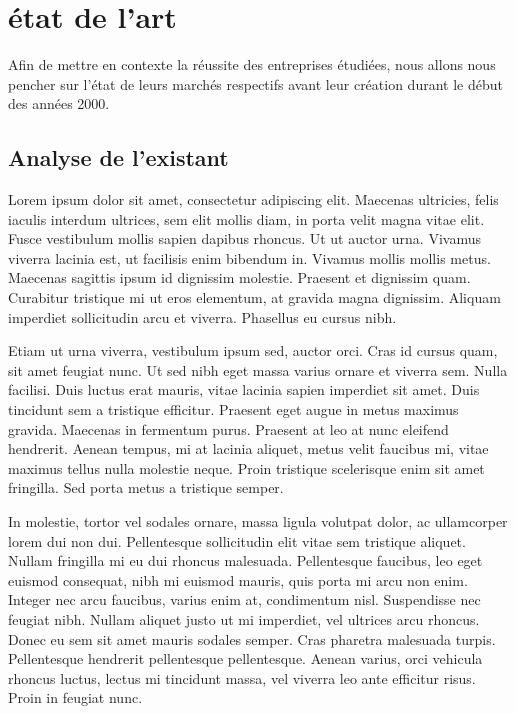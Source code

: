 \chapter{état de l’art}

Afin de mettre en contexte la réussite des entreprises étudiées, nous allons nous pencher sur l'état de leurs marchés respectifs avant leur création durant le début des années 2000.

\section{Analyse de l'existant }

Lorem ipsum dolor sit amet, consectetur adipiscing elit. Maecenas ultricies, felis iaculis interdum ultrices, sem elit mollis diam, in porta velit magna vitae elit. Fusce vestibulum mollis sapien dapibus rhoncus. Ut ut auctor urna. Vivamus viverra lacinia est, ut facilisis enim bibendum in. Vivamus mollis mollis metus. Maecenas sagittis ipsum id dignissim molestie. Praesent et dignissim quam. Curabitur tristique mi ut eros elementum, at gravida magna dignissim. Aliquam imperdiet sollicitudin arcu et viverra. Phasellus eu cursus nibh.

Etiam ut urna viverra, vestibulum ipsum sed, auctor orci. Cras id cursus quam, sit amet feugiat nunc. Ut sed nibh eget massa varius ornare et viverra sem. Nulla facilisi. Duis luctus erat mauris, vitae lacinia sapien imperdiet sit amet. Duis tincidunt sem a tristique efficitur. Praesent eget augue in metus maximus gravida. Maecenas in fermentum purus. Praesent at leo at nunc eleifend hendrerit. Aenean tempus, mi at lacinia aliquet, metus velit faucibus mi, vitae maximus tellus nulla molestie neque. Proin tristique scelerisque enim sit amet fringilla. Sed porta metus a tristique semper.

In molestie, tortor vel sodales ornare, massa ligula volutpat dolor, ac ullamcorper lorem dui non dui. Pellentesque sollicitudin elit vitae sem tristique aliquet. Nullam fringilla mi eu dui rhoncus malesuada. Pellentesque faucibus, leo eget euismod consequat, nibh mi euismod mauris, quis porta mi arcu non enim. Integer nec arcu faucibus, varius enim at, condimentum nisl. Suspendisse nec feugiat nibh. Nullam aliquet justo ut mi imperdiet, vel ultrices arcu rhoncus. Donec eu sem sit amet mauris sodales semper. Cras pharetra malesuada turpis. Pellentesque hendrerit pellentesque pellentesque. Aenean varius, orci vehicula rhoncus luctus, lectus mi tincidunt massa, vel viverra leo ante efficitur risus. Proin in feugiat nunc.

